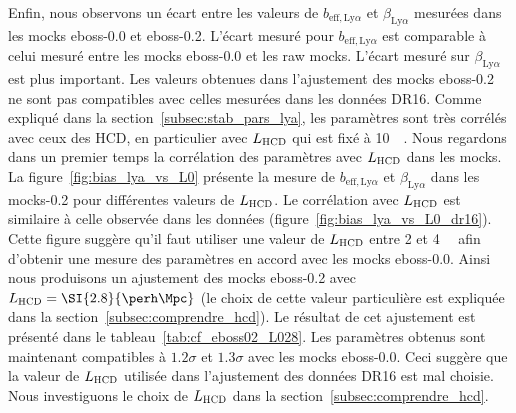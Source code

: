 Enfin, nous observons un écart entre les valeurs de $b_{\mathrm{eff},\mathrm{Ly}\alpha}$ et $\beta_{\mathrm{Ly}\alpha}$ mesurées dans les mocks eboss-0.0 et eboss-0.2. L'écart mesuré pour $b_{\mathrm{eff},\mathrm{Ly}\alpha}$ est comparable à celui mesuré entre les mocks eboss-0.0 et les raw mocks.
L'écart mesuré sur $\beta_{\mathrm{Ly}\alpha}$ est plus important. Les valeurs obtenues dans l'ajustement des mocks eboss-0.2 ne sont pas compatibles avec celles mesurées dans les données DR16.
Comme expliqué dans la section~\ref{subsec:stab_pars_lya}, les paramètres \lya{} sont très corrélés avec ceux des HCD, en particulier avec $L_{\textsc{HCD}}$ qui est fixé à \SI{10}{\perh\Mpc}.
Nous regardons dans un premier temps la corrélation des paramètres \lya{} avec $L_{\textsc{HCD}}$ dans les mocks. La figure~\ref{fig:bias_lya_vs_L0} présente la mesure de $b_{\mathrm{eff},\mathrm{Ly}\alpha}$ et $\beta_{\mathrm{Ly}\alpha}$ dans les mocks-0.2 pour différentes valeurs de $L_{\textsc{HCD}}$. Le corrélation avec $L_{\textsc{HCD}}$ est similaire à celle observée dans les données (figure~\ref{fig:bias_lya_vs_L0_dr16}).
Cette figure suggère qu'il faut utiliser une valeur de $L_{\textsc{HCD}}$ entre 2 et \SI{4}{\perh\Mpc} afin d'obtenir une mesure des paramètres \lya{} en accord avec les mocks eboss-0.0.
Ainsi nous produisons un ajustement des mocks eboss-0.2 avec $L_{\textsc{HCD}} = \SI{2.8}{\perh\Mpc}$ (le choix de cette valeur particulière est expliquée dans la section~\ref{subsec:comprendre_hcd}).
Le résultat de cet ajustement est présenté dans le tableau~\ref{tab:cf_eboss02_L028}.
Les paramètres \lya{} obtenus sont maintenant compatibles à $\num{1.2} \sigma$ et $\num{1.3} \sigma$  avec les mocks eboss-0.0.
Ceci suggère que la valeur de $L_{\textsc{HCD}}$ utilisée dans l'ajustement des données DR16 est mal choisie. Nous investiguons le choix de $L_{\textsc{HCD}}$ dans la section~\ref{subsec:comprendre_hcd}.


